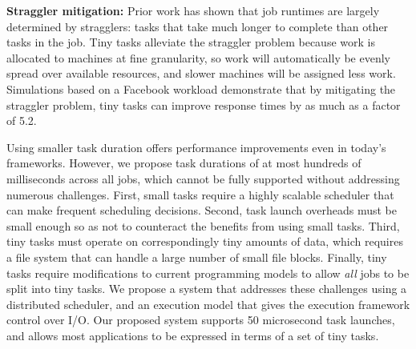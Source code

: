 \noindent\textbf{Straggler mitigation:}
Prior work has shown that job runtimes are largely determined by
stragglers: tasks that take much longer to complete than other tasks in the
job.
Tiny tasks alleviate the straggler problem because work is allocated to
machines at fine granularity, so work will automatically be evenly spread
over available resources, and slower machines will be assigned
less work. Simulations based on a Facebook workload
demonstrate that by mitigating the straggler problem, tiny tasks
can improve response times by as much as a factor of 5.2.


Using smaller task duration offers performance improvements even in
today's frameworks.  However, we propose task durations of at most
hundreds of milliseconds across all jobs, which cannot be fully supported without addressing
numerous challenges. First, small tasks require a highly scalable scheduler
that can make frequent scheduling decisions. Second,
task launch overheads must be small enough so as not to counteract the
benefits from using small tasks.
Third, tiny tasks must operate on correspondingly tiny amounts
of data, which requires a file system that can handle a large number of 
small file blocks. Finally, tiny tasks require modifications to current programming
models to allow \emph{all} jobs to be split into tiny tasks. We propose a system
that addresses these challenges using a distributed scheduler, and an execution model that gives the execution framework control
over I/O. Our proposed system supports
50 microsecond task launches, and allows most applications to be
expressed in terms of a set of tiny tasks.

